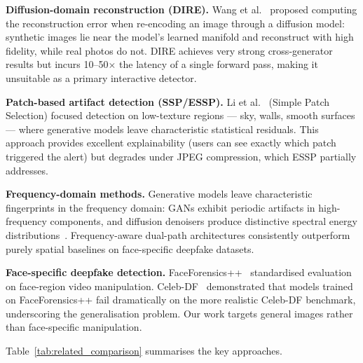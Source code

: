 \documentclass[12pt, a4paper]{article}
\begin{document}
\textbf{Diffusion-domain reconstruction (DIRE).}
Wang et al.~\cite{wang2023dire} proposed computing the reconstruction error when
re-encoding an image through a diffusion model: synthetic images lie near the
model's learned manifold and reconstruct with high fidelity, while real photos
do not.  DIRE achieves very strong cross-generator results but incurs 10–50$\times$
the latency of a single forward pass, making it unsuitable as a primary
interactive detector.

\textbf{Patch-based artifact detection (SSP/ESSP).}
Li et al.~\cite{li2024ssp} (Simple Patch Selection) focused detection on
low-texture regions — sky, walls, smooth surfaces — where generative models leave
characteristic statistical residuals.  This approach provides excellent
explainability (users can see exactly which patch triggered the alert) but
degrades under JPEG compression, which ESSP partially addresses.

\textbf{Frequency-domain methods.}
Generative models leave characteristic fingerprints in the frequency domain: GANs
exhibit periodic artifacts in high-frequency components, and diffusion denoisers
produce distinctive spectral energy distributions~\cite{corvi2023intriguing}.
Frequency-aware dual-path architectures consistently outperform purely spatial
baselines on face-specific deepfake datasets.

\textbf{Face-specific deepfake detection.}
FaceForensics++~\cite{rossler2019faceforensics} standardised evaluation on
face-region video manipulation.  Celeb-DF~\cite{li2020celebdf} demonstrated that
models trained on FaceForensics++ fail dramatically on the more realistic
Celeb-DF benchmark, underscoring the generalisation problem.  Our work targets
general images rather than face-specific manipulation.

Table~\ref{tab:related_comparison} summarises the key approaches.
\end{document}
